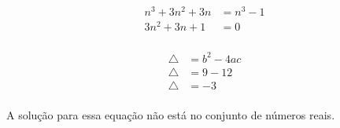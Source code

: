 \begin{question}
	\begin{equation}
	  \begin{split}
	  		n^{3} + 3n^{2} + 3n &= n^{3} -1 \\
	  	   3n^{2} + 3n +1 &= 0 \\ 
		\end{split}
	\end{equation}
	
	\begin{equation}
	  \begin{split}
	  	   \bigtriangleup &= b^{2} -4ac \\
	  	   \bigtriangleup &= 9 -12 \\
	  	   \bigtriangleup &= -3 \\
		\end{split}
	\end{equation}
	
	\begin{center}
		A solução para essa equação não está 
	   no conjunto de números reais.
	\end{center}

\end{question}
